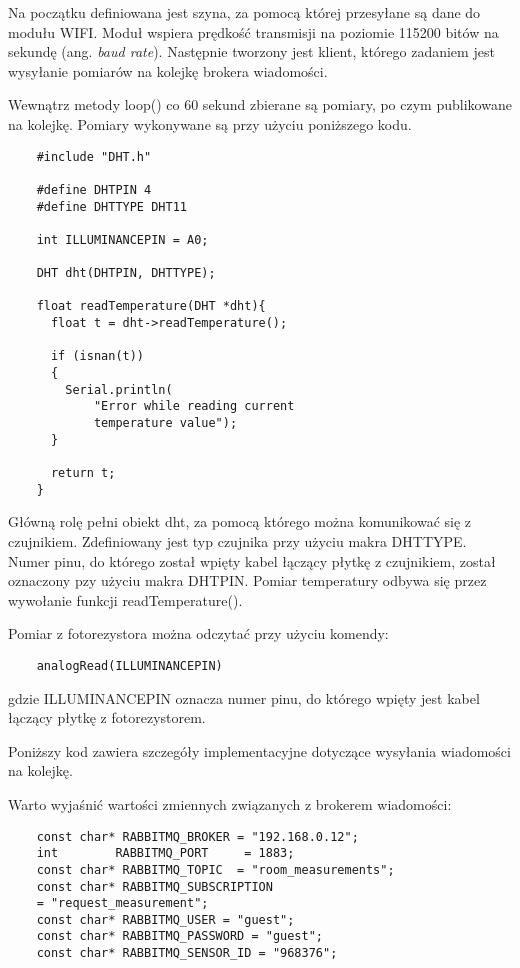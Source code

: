 Na początku definiowana jest szyna, za pomocą której przesyłane są dane do 
modułu WIFI. Moduł wspiera prędkość transmisji na poziomie 115200 bitów na 
sekundę (ang. \textit{baud rate}). Następnie tworzony jest klient, którego zadaniem
jest wysyłanie pomiarów na kolejkę brokera wiadomości. 

Wewnątrz metody loop() co 60 sekund zbierane są pomiary, po czym publikowane
na kolejkę. Pomiary wykonywane są przy użyciu poniższego kodu.

\begin{lstlisting}
    #include "DHT.h"

    #define DHTPIN 4
    #define DHTTYPE DHT11
    
    int ILLUMINANCEPIN = A0;
    
    DHT dht(DHTPIN, DHTTYPE);
    
    float readTemperature(DHT *dht){
      float t = dht->readTemperature();
     
      if (isnan(t))
      {
        Serial.println(
            "Error while reading current 
            temperature value");
      }
      
      return t;
    }
\end{lstlisting}

Główną rolę pełni obiekt dht, za pomocą którego można komunikować się
z czujnikiem. Zdefiniowany jest typ czujnika przy użyciu makra DHTTYPE.
Numer pinu, do którego został wpięty kabel łączący płytkę z czujnikiem,
został oznaczony pzy użyciu makra DHTPIN. Pomiar temperatury odbywa się
przez wywołanie funkcji readTemperature(). 

Pomiar z fotorezystora można odczytać przy użyciu komendy:  

\begin{lstlisting}
    analogRead(ILLUMINANCEPIN)
\end{lstlisting}

gdzie ILLUMINANCEPIN oznacza numer pinu, do 
którego wpięty jest kabel łączący płytkę z fotorezystorem.

Poniższy kod zawiera szczegóły implementacyjne dotyczące 
wysyłania wiadomości na kolejkę.



Warto wyjaśnić wartości zmiennych związanych z brokerem wiadomości:
\begin{lstlisting}
    const char* RABBITMQ_BROKER = "192.168.0.12";
    int        RABBITMQ_PORT     = 1883;
    const char* RABBITMQ_TOPIC  = "room_measurements";
    const char* RABBITMQ_SUBSCRIPTION  
    = "request_measurement";
    const char* RABBITMQ_USER = "guest";
    const char* RABBITMQ_PASSWORD = "guest";
    const char* RABBITMQ_SENSOR_ID = "968376";
\end{lstlisting}

